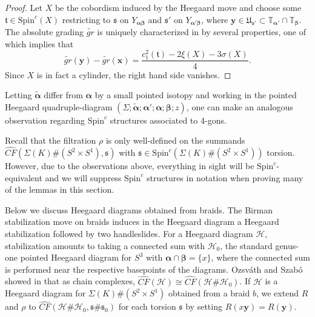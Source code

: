 \documentclass[11pt]{article}
\theoremstyle{plain} \newtheorem{thm}{Theorem}[subsection]
\theoremstyle{plain} \newtheorem{cor}[thm]{Corollary}
\theoremstyle{plain} \newtheorem{prop}[thm]{Proposition}
\theoremstyle{plain} \newtheorem{conj}[thm]{Conjecture}
\theoremstyle{plain} \newtheorem{lem}[thm]{Lemma}
\theoremstyle{definition} \newtheorem{df}[thm]{Definition}
\theoremstyle{remark} \newtheorem{rmk}[thm]{Remark}
\theoremstyle{remark} \newtheorem{obs}[thm]{Observation}
\newcommand{\DBCs}[1]{\Sigma(#1)\#(S^{2}\times S^{1})}
\newcommand{\h}{\mathcal{H}}
\newcommand{\tld}[1]{\widetilde{#1}}
\newcommand{\OS}{Ozsv\'ath and Szab\'o }
\newcommand{\CFxs}[1]{\widehat{CF}(\DBCs{#1}, \mathfrak{s})}
\newcommand{\Scx}[1]{\text{Spin}^{c}(\DBCs{#1})}
\newcommand{\ba}{\boldsymbol{\alpha}}
\newcommand{\bb}{\boldsymbol{\beta}}
\newcommand{\bx}{\mathbf{x}}
\newcommand{\by}{\mathbf{y}}
\newcommand{\Yab}{Y_{\ba\bb}}
\newcommand{\Yapb}{Y_{\ba'\bb}}
\newcommand{\tor}[1]{\mathbb{T}_{#1}}
\begin{document}
\begin{proof}
Let $X$ be the cobordism induced by the Heegaard move and choose some $\mathfrak{t} \in \text{Spin}^{c}(X)$ restricting to $\mathfrak{s}$ on $\Yab$ and $\mathfrak{s}'$ on $\Yapb$, where $\by \in \mathfrak{U}_{\mathfrak{s}'} \subset  \tor{\ba'} \cap \tor{\bb}$.  The absolute grading $\tld{gr}$ is uniquely characterized in \cite{os:abs} by several properties, one of which implies that
$$ \tld{gr}(\by) - \tld{gr}(\bx) = \frac{c_1^2(\mathfrak{t}) - 2 \xi(X) - 3 \sigma(X)}{4}.$$
Since $X$ is in fact a cylinder, the right hand side vanishes.
\end{proof}

Letting $\tld{\ba}$ differ from $\ba$ by a small pointed isotopy and working in the pointed Heegaard quadruple-diagram $\left(\Sigma; \tld{\ba}; \ba'; \ba; \bb; z\right)$, one can make an analogous observation regarding $\text{Spin}^{c}$ structures associated to 4-gons.

Recall that the filtration $\rho$ is only well-defined on the summands $\CFxs{K}$ with $\mathfrak{s}\in \Scx{K}$ torsion.  However, due to the observations above, everything in sight will be $\text{Spin}^{c}$-equivalent and we will suppress $\text{Spin}^{c}$ structures in notation when proving many of the lemmas in this section.

Below we discuss Heegaard diagrams obtained from braids.  The Birman stabilization move on braids induces in the Heegaard diagram a Heegaard stabilization followed by two handleslides.  For a Heegaard diagram $\h$, stabilization amounts to taking a connected sum with $\h_{0}$, the standard genus-one pointed Heegaard diagram for $S^{3}$ with $\ba \cap \bb = \{ x \}$, where the connected sum is performed near the respective basepoints of the diagrams.  \OS showed in \cite{os:disk} that as chain complexes, $\widehat{CF}(\h) \cong \widehat{CF}(\h \# \h_{0})$.  If $\h$ is a Heegaard diagram for $\DBCs{K}$ obtained from a braid $b$, we extend $R$ and $\rho$ to $\widehat{CF}(\h \# \h_{0}, \mathfrak{s} \# \mathfrak{s}_{0})$ for each torsion $\mathfrak{s}$ by setting $R(x\by) = R(\by)$.
\end{document}
